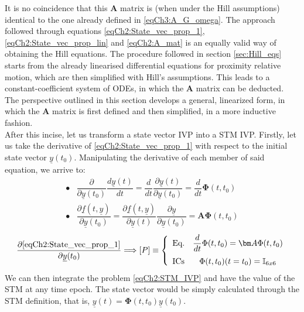 	\indent It is no coincidence that this $\bm A$ matrix is (when under the Hill assumptions) identical to the one already defined in \eqref{eqCh3:A_G_omega}. The approach followed through equations \eqref{eqCh2:State_vec_prop_1}, \eqref{eqCh2:State_vec_prop_lin} and \eqref{eqCh2:A_mat} is an equally valid way of obtaining the Hill equations. The procedure followed in section \ref{sec:Hill_eqs} starts from the already linearised differential equations for proximity relative motion, which are then simplified with Hill's assumptions. This leads to a constant-coefficient system of ODEs, in which the $\bm A$ matrix can be deducted. The perspective outlined in this section develops a general, linearized form, in which the $\bm A$ matrix is first defined and then simplified, in a more inductive fashion.\\
	\indent After this incise, let us transform a state vector IVP into a STM IVP. Firstly, let us take the derivative of \eqref{eqCh2:State_vec_prop_1} with respect to the initial state vector $\underline{y}(t_0)$. Manipulating the derivative of each member of said equation, we arrive to:
	\[
	\begin{array}{ll}
	\bullet & \dfrac{\partial}{{\partial \underline{y}(t_0)}} \dfrac{d\underline{y}(t)}{dt} = \dfrac{d}{dt}\dfrac{\partial \underline{y}(t)} {{\partial \underline{y}(t_0)}} = \dfrac{d}{dt} \bm \Phi (t, t_0) \\[1.2em]
	\bullet & \dfrac{\partial \underline{f}(t, \underline{y})}{{\partial \underline{y}(t_0)}}  = \dfrac{\partial \underline{f}(t, \underline{y})}{{\partial \underline{y}(t)}} \dfrac{\partial \underline{y}}{{\partial \underline{y}(t_0)}} = \bm A \bm \Phi(t, t_0)
	\end{array}
	\]
	\begin{equation}
	\dfrac{\partial \eqref{eqCh2:State_vec_prop_1}}{\partial \underline{y}(t_0)} \Longrightarrow [P]\equiv\left\{ \begin{array}{lcc}
	\text{Eq.} &  \dfrac{d}{dt} \Phi (t, t_0) = \bm A \Phi (t, t_0)\\[1em]
	\text{ICs} &  \Phi (t, t_0) (t = t_0) = \mathbb{I}_{6x6} 
	\end{array}\right.
	\label{eqCh2:STM_IVP}
	\end{equation}
	\indent We can then integrate the problem \eqref{eqCh2:STM_IVP} and have the value of the STM at any time epoch. The state vector would be simply calculated through the STM definition, that is, $\underline{y}(t) = \bm \Phi (t, t_0) \underline{y}(t_0)$.
